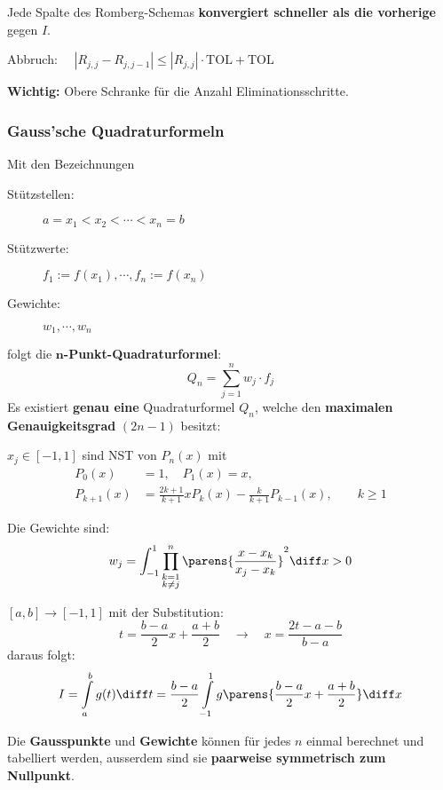 			Jede Spalte des Romberg-Schemas \textbf{konvergiert schneller als die vorherige} gegen $I$.

			Abbruch: $\quad |R_{j,j}-R_{j,j-1}|\leq |R_{j,j}|\cdot \mathrm{TOL} + \mathrm{TOL}$

			\textbf{Wichtig:} Obere Schranke für die Anzahl Eliminationsschritte.

		\subsubsection{Gauss'sche Quadraturformeln}
			Mit den Bezeichnungen
			\begin{description}
				\item[Stützstellen:] $a= x_1 < x_2 < \cdots < x_n = b$
				\item[Stützwerte:] $f_1:=f(x_1), \cdots , f_n := f(x_n)$
				\item[Gewichte:] $w_1, \cdots, w_n$
			\end{description}
			folgt die \textbf{$\mathbf{n}$-Punkt-Quadraturformel}:
			\[
				Q_n = \sum_{j=1}^n w_j\cdot f_j
			\]
			Es existiert \textbf{genau eine} Quadraturformel $Q_n$, welche den \textbf{maximalen Genauigkeitsgrad} $(2n-1)$ besitzt:
			\begin{tightitemize}
				\item $x_j \in [-1,1]$ sind NST von $P_n(x)$ mit
					\begin{align*}
						P_0(x) &= 1, \quad P_1(x) = x, \\
						P_{k+1}(x) &= \frac{2k + 1}{k+1}xP_k(x) - \frac{k}{k+1}P_{k-1}(x), \qquad k\geq 1
					\end{align*}
				\item Die Gewichte sind:
					\[
						w_j = \int_{-1}^1 \prod_{\substack{
							k=1 \\ k \neq j
						}}^{n} \parens{ \frac{x-x_k}{x_j-x_k}}^2 \diff x> 0
					\]
				\item $[a,b] \to [-1,1]$ mit der Substitution:
					\[
						t= \frac{b-a}{2}x + \frac{a+b}{2}
						\quad \rightarrow \quad
						x = \frac{2t - a - b}{b - a}
					\]
					daraus folgt:
					\[
						I = \int\limits_a^b g(t) \diff t = \frac{b-a}{2}\int\limits_{-1}^1g \parens{ \frac{b-a}{2}x + \frac{a+b}{2}} \diff x
					\]
			\end{tightitemize}

			Die \textbf{Gausspunkte} und \textbf{Gewichte} können für jedes $n$ einmal berechnet und tabelliert werden, ausserdem sind sie \textbf{paarweise symmetrisch zum Nullpunkt}.

